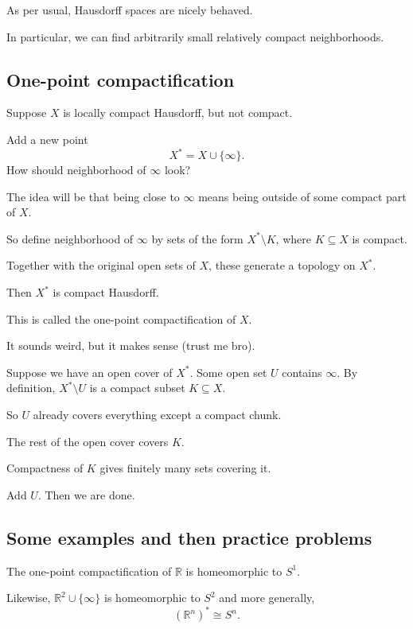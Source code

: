 \documentclass[11pt]{article}
\begin{document}
As per usual, Hausdorff spaces are nicely behaved. 

In particular, we can find arbitrarily small 
relatively compact neighborhoods. 

\subsection{One-point compactification}

Suppose $X$ is locally compact Hausdorff, but not 
compact. 

Add a new point 
\[
    X^* = X \cup \{\infty\}. 
\]
How should neighborhood of $\infty$ look? 

The idea will be that being close to $\infty$ means 
being outside of some compact part of $X$. 

So define neighborhood of $\infty$ by sets of 
the form $X^* \setminus K$, where $K \subseteq X$ is 
compact. 

Together with the original open sets of $X$, these 
generate a topology on $X^*$. 

Then $X^*$ is compact Hausdorff. 

This is called the one-point compactification of $X$. 

It sounds weird, but it makes sense (trust me bro). 

Suppose we have an open cover of 
$X^*$. Some open set $U$ contains $\infty$. 
By definition, $X^* \setminus U$ is a compact 
subset $K \subseteq X$. 

So $U$ already covers everything except a compact chunk. 

The rest of the open cover covers $K$. 

Compactness of $K$ gives finitely many sets covering it. 

Add $U$. Then we are done. 

\subsection{Some examples and then practice problems}

The one-point compactification of $\mathbb R$ is 
homeomorphic to $S^1$. 

Likewise, $\mathbb R^2 \cup \{\infty\}$ is 
homeomorphic to $S^2$ and more generally, 
\[
    (\mathbb R^n)^* \cong S^n. 
\]
\end{document}
